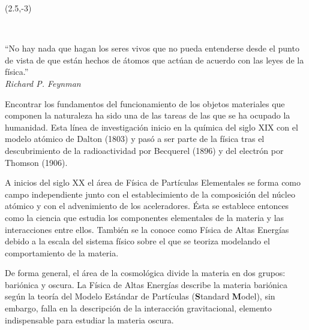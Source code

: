 \begin{textblock}{9}(2.5,-3)
\begin{flushright}
\setlength{\baselineskip}{15pt}
~

``No hay nada que hagan los seres vivos que no pueda entenderse desde el punto de vista de que están hechos de átomos que actúan de acuerdo con las leyes de la física.''\\[.5cm]
\textit{Richard P. Feynman}
\end{flushright}
\end{textblock}


Encontrar los fundamentos del funcionamiento de los objetos materiales que componen la naturaleza ha sido una de las tareas de las que se ha ocupado la humanidad. Esta línea de investigación inicio en la química del siglo XIX con el modelo atómico de Dalton (1803) y pasó a ser parte de la física tras el descubrimiento de la radioactividad por %
Becquerel (1896) y del electrón por Thomson (1906).

A inicios del siglo XX el área de Física de Partículas Elementales se forma como campo independiente junto con el establecimiento de la composición del núcleo atómico y con el advenimiento de los aceleradores. Ésta se establece entonces como la ciencia que estudia los componentes elementales de la materia y las interacciones entre ellos. También se la conoce como Física de Altas Energías debido a la escala del sistema físico sobre el que se teoriza modelando el comportamiento de la materia.

De forma general, el área de la cosmológica divide la materia en dos grupos: bariónica y oscura. La Física de Altas Energías describe la materia bariónica según la teoría del Modelo Estándar de Partículas \ME(\textbf{S}tandard \textbf{M}odel),  sin embargo, falla en la descripción de la interacción gravitacional, elemento indispensable para estudiar la materia oscura.
